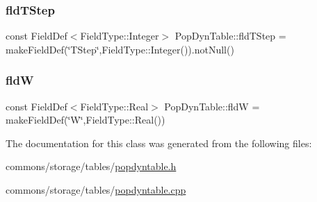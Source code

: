 \subsubsection{\texorpdfstring{fldTStep}{fldTStep}}
{\footnotesize\ttfamily const Field\+Def$<$Field\+Type\+::\+Integer$>$ Pop\+Dyn\+Table\+::fld\+T\+Step = make\+Field\+Def(\char`\"{}T\+Step\char`\"{},Field\+Type\+::\+Integer()).not\+Null()}

\mbox{\label{class_pop_dyn_table_ab53c52a14f297070f8d9425d4ac48a71}} 
\subsubsection{\texorpdfstring{fldW}{fldW}}
{\footnotesize\ttfamily const Field\+Def$<$Field\+Type\+::\+Real$>$ Pop\+Dyn\+Table\+::fldW = make\+Field\+Def(\char`\"{}W\char`\"{},Field\+Type\+::\+Real())}



The documentation for this class was generated from the following files\+:\begin{DoxyCompactItemize}
\item 
commons/storage/tables/\mbox{\hyperlink{popdyntable_8h}{popdyntable.\+h}}\item 
commons/storage/tables/\mbox{\hyperlink{popdyntable_8cpp}{popdyntable.\+cpp}}\end{DoxyCompactItemize}
